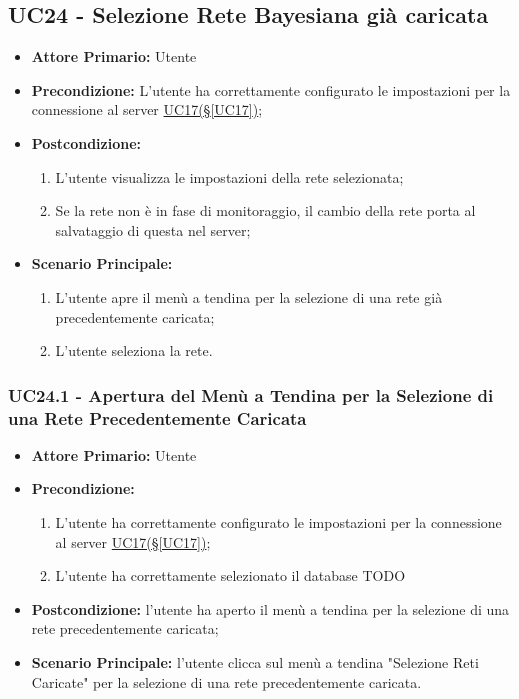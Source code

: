 \subsection{UC24 - Selezione Rete Bayesiana già caricata}\label{UC24}
\begin{itemize}
	\item \textbf{Attore Primario:}  Utente
	\item \textbf{Precondizione:} L'utente ha correttamente configurato le impostazioni per la connessione al server \hyperref[UC17]{UC17(§\ref*{UC17})};
	\item \textbf{Postcondizione:} 
	\begin{enumerate}
		\item L'utente visualizza le impostazioni della rete selezionata;
		\item Se la rete non è in fase di monitoraggio, il cambio della rete porta al salvataggio di questa nel server;
	\end{enumerate}
	\item \textbf{Scenario Principale:}
	\begin{enumerate}
		\item L'utente apre il menù a tendina per la selezione di una rete già precedentemente caricata;
		\item L'utente seleziona la rete.
	\end{enumerate}
\end{itemize}

\subsubsection{UC24.1 - Apertura del Menù a Tendina per la Selezione di una Rete Precedentemente Caricata}\label{UC24.1}
\begin{itemize}
	\item \textbf{Attore Primario:}  Utente
	\item \textbf{Precondizione:} 
	\begin{enumerate}
		\item L'utente ha correttamente configurato le impostazioni per la connessione al server \hyperref[UC17]{UC17(§\ref*{UC17})};
		\item L'utente ha correttamente selezionato il database TODO %
	\end{enumerate}	
	\item \textbf{Postcondizione:} l'utente ha aperto il menù a tendina per la selezione di una rete precedentemente caricata;
	\item \textbf{Scenario Principale:} l'utente clicca sul menù a tendina "Selezione Reti Caricate" per la selezione di una rete  precedentemente caricata.
\end{itemize}

